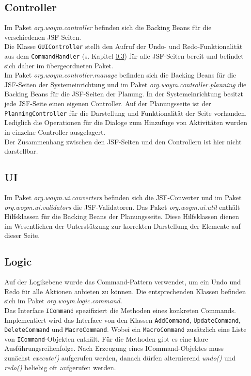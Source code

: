\documentclass[fontsize=12pt,paper=a4,twoside]{scrartcl}
\begin{document}



\subsection{Controller}
\label{subsec:Controller}

Im Paket \textit{org.woym.controller} befinden sich die Backing Beans für die verschiedenen JSF-Seiten. \\
Die Klasse \texttt{GUIController} stellt den Aufruf der Undo- und Redo-Funktionalität aus dem \texttt{CommandHandler} (s. Kapitel \ref{subsec:logic}) für alle JSF-Seiten bereit und befindet sich daher im übergeordneten Paket.\\
Im Paket \textit{org.woym.controller.manage} befinden sich die Backing Beans für die JSF-Seiten der Systemeinrichtung und im Paket \textit{org.woym.controller.planning} die Backing Beans für die JSF-Seiten der Planung. In der Systemeinrichtung besitzt jede JSF-Seite einen eigenen Controller. Auf der Planungsseite ist der \texttt{PlanningController} für die Darstellung und Funktionalität der Seite vorhanden. Lediglich die Operationen für die Dialoge zum Hinzufüge von Aktivitäten wurden in einzelne Controller ausgelagert.\\
Der Zusammenhang zwischen den JSF-Seiten und den Controllern ist hier nicht darstellbar.





\subsection{UI}
\label{subsec:UI}

Im Paket \textit{org.woym.ui.converters} befinden sich die JSF-Converter und im Paket \textit{org.woym.ui.validators} die JSF-Validatoren. Das Paket \textit{org.woym.ui.util} enthält Hilfsklassen für die Backing Beans der Planungsseite. Diese Hilfsklassen dienen im Wesentlichen der Unterstützung zur korrekten Darstellung der Elemente auf dieser Seite.\clearpage




\subsection{Logic}
\label{subsec:logic}
Auf der Logikebene wurde das Command-Pattern verwendet, um ein Undo und Redo für alle Aktionen anbieten zu können. Die entsprechenden Klassen befinden sich im Paket \textit{org.woym.logic.command}. \\
Das Interface \texttt{ICommand} spezifiziert die Methoden eines konkreten Commands. Implementiert wird das Interface von den Klassen \texttt{AddCommand}, \texttt{UpdateCommand}, \texttt{DeleteCommand} und \texttt{MacroCommand}. Wobei ein \texttt{MacroCommand} zusätzlich eine Liste von \texttt{ICommand}-Objekten enthält. Für die Methoden gibt es eine klare Ausführungsreihenfolge. Nach Erzeugung eines ICommand-Objektes muss zunächst \textit{execute()} aufgerufen werden, danach dürfen alternierend \textit{undo()} und \textit{redo()} beliebig oft aufgerufen werden. \\
\end{document}
